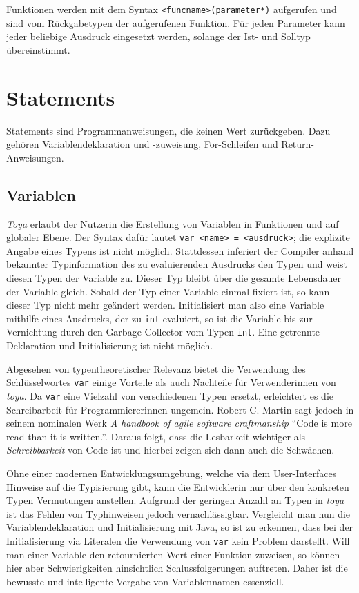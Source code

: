 Funktionen werden mit dem Syntax \texttt{<funcname>(parameter*)} aufgerufen und sind vom Rückgabetypen der aufgerufenen Funktion. Für jeden Parameter kann jeder beliebige Ausdruck eingesetzt werden, solange der Ist- und Solltyp übereinstimmt.


\section{Statements}

Statements sind Programmanweisungen, die keinen Wert zurückgeben. Dazu gehören Variablendeklaration und -zuweisung, For-Schleifen und Return-Anweisungen.

\subsection{Variablen}
\textit{Toya} erlaubt der Nutzerin die Erstellung von Variablen in Funktionen und auf globaler Ebene. Der Syntax dafür lautet \texttt{var <name> = <ausdruck>}; die explizite Angabe eines Typens ist nicht möglich. Stattdessen inferiert der Compiler anhand bekannter Typinformation des zu evaluierenden Ausdrucks den Typen und weist diesen Typen der Variable zu. Dieser Typ bleibt über die gesamte Lebensdauer der Variable gleich. Sobald der Typ einer Variable einmal fixiert ist, so kann dieser Typ nicht mehr geändert werden. Initialisiert man also eine Variable mithilfe eines Ausdrucks, der zu \texttt{int} evaluiert, so ist die Variable bis zur Vernichtung durch den Garbage Collector vom Typen \texttt{int}. Eine getrennte Deklaration und Initialisierung ist nicht möglich.

Abgesehen von typentheoretischer Relevanz bietet die Verwendung des Schlüsselwortes \texttt{var} einige Vorteile als auch Nachteile für Verwenderinnen von \textit{toya}. Da \texttt{var} eine Vielzahl von verschiedenen Typen ersetzt, erleichtert es die Schreibarbeit für Programmiererinnen ungemein. Robert C. Martin sagt jedoch in seinem nominalen Werk \textit{A handbook of agile software craftmanship} ``Code is more read than it is written.''. Daraus folgt, dass die Lesbarkeit wichtiger als \textit{Schreibbarkeit} von Code ist und hierbei zeigen sich dann auch die Schwächen.

Ohne einer modernen Entwicklungsumgebung, welche via dem User-Interfaces Hinweise auf die Typisierung gibt, kann die Entwicklerin nur über den konkreten Typen Vermutungen anstellen. Aufgrund der geringen Anzahl an Typen in \textit{toya} ist das Fehlen von Typhinweisen jedoch vernachlässigbar. Vergleicht man nun die Variablendeklaration und Initialisierung mit Java, so ist zu erkennen, dass bei der Initialisierung via Literalen die Verwendung von \texttt{var} kein Problem darstellt. Will man einer Variable den retournierten Wert einer Funktion zuweisen, so können hier aber Schwierigkeiten hinsichtlich Schlussfolgerungen auftreten. Daher ist die bewusste und intelligente Vergabe von Variablennamen essenziell.

